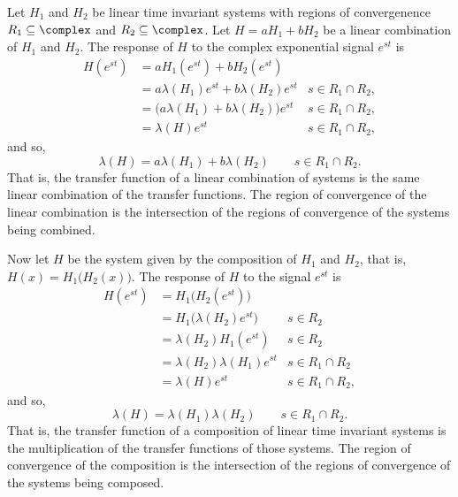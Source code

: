 
Let $H_1$ and $H_2$ be linear time invariant systems with regions of convergenence $R_1 \subseteq \complex$ and $R_2\subseteq \complex$.  Let $H = a H_1 + bH_2$ be a linear combination of $H_1$ and $H_2$.  The response of $H$ to the complex exponential signal $e^{st}$ is
\begin{align*}
H(e^{st}) &= a H_1(e^{st}) + b H_2(e^{st}) \\
&= a\lambda(H_1)e^{st} + b\lambda(H_2)e^{st} & s \in R_1 \cap R_2, \\
&= \big( a\lambda(H_1) + b\lambda(H_2) \big) e^{st} & s \in R_1 \cap R_2,\\
&= \lambda(H) e^{st} & s \in R_1 \cap R_2,
\end{align*}
and so,
\[
\lambda(H) = a\lambda(H_1) + b\lambda(H_2) \qquad s \in R_1 \cap R_2.
\]
That is, the transfer function of a linear combination of systems is the same linear combination of the transfer functions.  The region of convergence of the linear combination is the intersection of the regions of convergence of the systems being combined.


Now let $H$ be the system given by the composition of $H_1$ and $H_2$, that is, $H(x) = H_1\big(H_2(x)\big)$.  The response of $H$ to the signal $e^{st}$ is
\begin{align*}
H(e^{st}) &= H_1\big(H_2(e^{st})\big) \\
&= H_1\big(\lambda(H_2) e^{st} \big) & s \in R_2\\
&= \lambda(H_2)H_1(e^{st}) & s \in R_2 \\
&= \lambda(H_2)\lambda(H_1) e^{st} & s \in R_1 \cap R_2 \\
&= \lambda(H) e^{st} & s \in R_1 \cap R_2,
\end{align*}
and so, 
\begin{equation}\label{eq:composedtransferfunction}
\lambda(H) = \lambda(H_1)\lambda(H_2) \qquad s \in R_1 \cap R_2.
\end{equation}
That is, the transfer function of a composition of linear time invariant systems is the multiplication of the transfer functions of those systems.  The region of convergence of the composition is the intersection of the regions of convergence of the systems being composed.

